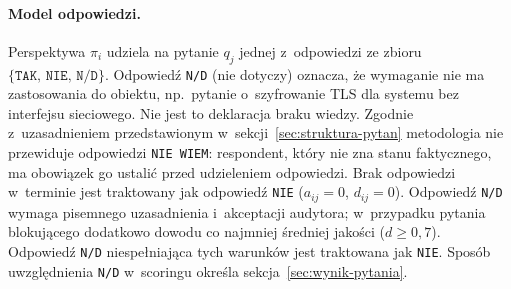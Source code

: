\paragraph{Model odpowiedzi.}
Perspektywa $\pi_i$ udziela na pytanie $q_j$ jednej z~odpowiedzi ze zbioru
$\{\texttt{TAK},\, \texttt{NIE},\, \texttt{N/D}\}$.
Odpowiedź \texttt{N/D} (nie dotyczy) oznacza, że wymaganie nie ma zastosowania do obiektu, np.\ pytanie o~szyfrowanie TLS dla systemu bez interfejsu sieciowego. Nie jest to deklaracja braku wiedzy. Zgodnie z~uzasadnieniem przedstawionym w~sekcji~\ref{sec:struktura-pytan} metodologia nie przewiduje odpowiedzi \texttt{NIE WIEM}: respondent, który nie zna stanu faktycznego, ma obowiązek go ustalić przed udzieleniem odpowiedzi. Brak odpowiedzi w~terminie jest traktowany jak odpowiedź \texttt{NIE} ($a_{ij} = 0$, $d_{ij} = 0$). Odpowiedź \texttt{N/D} wymaga pisemnego uzasadnienia i~akceptacji audytora; w~przypadku pytania blokującego dodatkowo dowodu co najmniej średniej jakości ($d \geq 0{,}7$). Odpowiedź \texttt{N/D} niespełniająca tych warunków jest traktowana jak \texttt{NIE}. Sposób uwzględnienia \texttt{N/D} w~scoringu określa sekcja~\ref{sec:wynik-pytania}.

